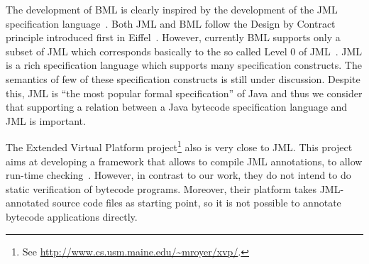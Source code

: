 The development of BML is clearly inspired by the development of the
JML specification language~\cite{JMLRefMan}. Both JML and
BML follow the Design by Contract principle introduced first in
Eiffel~\cite{Meyer97}. However, currently BML supports only a subset of JML which corresponds
basically to the so called Level 0 of JML~\cite{JMLRefMan}.
JML is a rich specification language which supports many specification constructs. 
The semantics of few of these specification constructs is still under discussion.
Despite this, JML is ``the most popular formal specification'' of Java and thus 
we consider that supporting a relation between a Java bytecode specification language and JML is important.  


The Extended Virtual Platform project\footnote{See \url{http://www.cs.usm.maine.edu/~mroyer/xvp/}.} also is very close to JML.
 This project aims at developing a framework that allows to compile JML annotations, to
allow run-time checking~\cite{AlagicXVP05}. However, in contrast to
our work, they do not intend to do static verification of bytecode
programs. Moreover, their platform takes JML-annotated source code
files as starting point, so it is not possible to annotate bytecode
applications directly.

